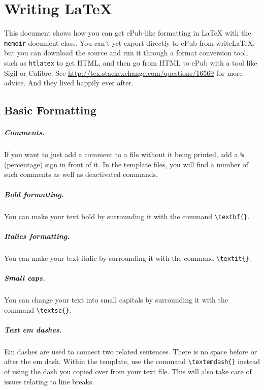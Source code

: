 \chapter{Writing \LaTeX{}}\label{cha:c1_firstchapter}

This document shows how you can get ePub-like formatting in \LaTeX{} with the
\verb|memoir| document class. You can't yet export directly to ePub from
writeLaTeX, but you can download the source and run it through a format
conversion tool, such as \verb|htlatex| to get HTML, and then go from HTML to
ePub with a tool like Sigil or Calibre. See
\url{http://tex.stackexchange.com/questions/16569} for more advice. And they
lived happily ever after.

\section{Basic Formatting}\label{sec:c1_basicformatting}

\paragraph{Comments.} If you want to just add a comment to a file without it
being printed, add a \lstinline[language=Tex]!%! (percentage) sign in front of
it. In the template files, you will find a number of such comments as well as
deactivated commands.

\paragraph{Bold formatting.} You can make your text bold by surrounding it with
the command \lstinline[language=Tex]!\textbf{}!.

\paragraph{Italics formatting.} You can make your text italic by surrounding it
with the command \lstinline[language=Tex]!\textit{}!.

\paragraph{Small caps.} You can change your text into small capitals by
surrounding it with the command \lstinline[language=Tex]!\textsc{}!.
    
\paragraph{Text em dashes.} Em dashes are used to connect two related sentences.
There is no space before or after the em dash. Within the template, use the
command \lstinline[language=Tex]!\textemdash{}! instead of using the dash you
copied over from your text file. This will also take care of issues relating to
line breaks.

